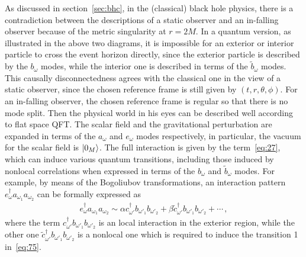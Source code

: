 \documentclass[12pt,a4paper]{article}
\begin{document}
As discussed in section~\ref{sec:bhc}, in the (classical) black hole physics, there is a contradiction between the descriptions of a static observer and an in-falling observer because of the metric singularity at $r=2M$. In a quantum version, as illustrated in
the above two diagrams, it is impossible for an exterior or interior particle to cross
the event horizon directly, since the exterior particle is described by the $b_{\omega}$ modes, while the interior one is described in terms of the
$\tilde{b}_{\omega}$ modes. This causally disconnectedness agrees with the classical one in the view of a static observer, since the chosen
reference frame is still given by $(t,r,\theta,\phi)$. For an in-falling observer, the chosen reference frame is regular so that
there is no mode split. Then the physical world in his
eyes can be described well according to flat space QFT.
The scalar field and the gravitational perturbation are expanded in terms of the $a_{\omega}$ and $e_{\omega}$ modes respectively, in particular, the vacuum for the scalar field is
$\arrowvert0_M\rangle$. The full interaction is given by the term~\eqref{eq:27}, which can induce various quantum transitions, including those induced by nonlocal correlations when expressed in terms of the $b_{\omega}$ and $\tilde{b}_{\omega}$ modes. For example, by means of the Bogoliubov transformations, an
interaction pattern $e_{\omega}^{\dag}a_{\omega_1}a_{\omega_2}$ can be formally expressed as
\begin{equation}
\label{eq:81}
\begin{split}
e_{\omega}^{\dag}a_{\omega_1}a_{\omega_2}\sim \alpha
c_{\omega'}^{\dag}b_{\omega'_1}b_{\omega'_2}+
\beta\tilde{c}_{\omega'}^{\dag}b_{\omega'_1}b_{\omega'_2}+\cdots \,,
\end{split}
\end{equation}
where the term $c_{\omega'}^{\dag}b_{\omega'_1}b_{\omega'_2}$ is an local interaction in the exterior region, while the
other one $\tilde{c}_{\omega'}^{\dag}b_{\omega'_1}b_{\omega'_2}$ is a nonlocal one which is required to induce the
transition 1 in~\eqref{eq:75}.
\end{document}
